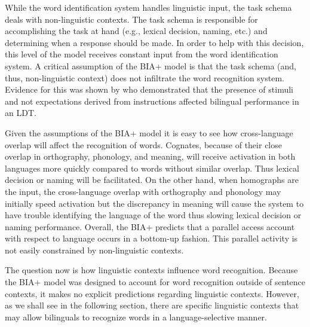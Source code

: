 While the word identification system handles linguistic input, the task schema deals with non-linguistic contexts. The task schema is responsible for accomplishing the task at hand (e.g., lexical decision, naming, etc.) and determining when a response should be made. In order to help with this decision, this level of the model receives constant input from the word identification system. A critical assumption of the BIA+ model is that the task schema (and, thus, non-linguistic context) does not infiltrate the word recognition system.  Evidence for this was shown by \textcite{Dijkstra2000} who demonstrated that the presence of stimuli and not expectations derived from instructions affected bilingual performance in an LDT.


Given the assumptions of the BIA+ model it is easy to see how cross-language overlap will affect the recognition of words. Cognates, because of their close overlap in orthography, phonology, and meaning, will receive activation in both languages more quickly compared to words without similar overlap. Thus lexical decision or naming will be facilitated. On the other hand, when homographs are the input, the cross-language overlap with orthography and phonology may initially speed activation but the discrepancy in meaning will cause the system to have trouble identifying the language of the word thus slowing lexical decision or naming performance. Overall, the BIA+ predicts that a parallel access account with respect to language occurs in a bottom-up fashion. This parallel activity is not easily constrained by non-linguistic contexts. 

The question now is how linguistic contexts influence word recognition. Because the BIA+ model was designed to account for word recognition outside of sentence contexts, it makes no explicit predictions regarding linguistic contexts. However, as we shall see in the following section, there are specific linguistic contexts that may allow bilinguals to recognize words in a language-selective manner.

